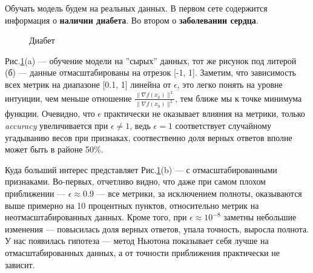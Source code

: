 \documentclass{article}
\begin{document}
	Обучать модель будем на реальных данных. В первом сете содержится информация о \textbf{наличии диабета}. Во втором о \textbf{заболевании сердца}.
	
	\begin{figure}[H]
		\centering
		\hfill %
		\caption{Диабет}
		\label{fig:diabet}
	\end{figure}
	
	\newpage
	Рис.\ref{fig:diabet}(a) --- обучение модели на ''сырых'' данных, тот же рисунок под литерой (б) --- данные отмасштабированы на отрезок [-1, 1]. Заметим, что зависимость всех метрик на диапазоне [0.1, 1] линейна от $\epsilon$, это легко понять на уровне интуиции, чем меньше отношение $\frac{\|\nabla f(x_k) \|^2 }{\|\nabla f(x_0) \|^2}$, тем ближе мы к точке минимума функции. Очевидно, что $\epsilon$ практически не оказывает влияния на метрики, только \textit{accuracy}  увеличивается при $\epsilon \neq 1$, ведь $\epsilon = 1$ соответствует случайному угадыванию весов при признаках, соотвественно доля верных ответов вполне может быть в районе 50\%.
	
	Куда больший интерес представляет Рис.\ref{fig:diabet}(b) --- с  отмасштабированными признаками. Во-первых, отчетливо видно, что даже при самом плохом приближении --- $\epsilon \approx 0.9$ --- все метрики, за исключением полноты, оказываются выше примерно на 10 процентных пунктов, относительно метрик на неотмасштабированных данных. Кроме того, при $\epsilon \approx 10^{-8}$ заметны небольшие изменения --- повысилась доля верных ответов, упала точность, выросла полнота. У нас появилась гипотеза --- метод Ньютона показывает себя лучше на отмасштабированных данных, а от точности приближения практически не зависит. 
	
\end{document}
